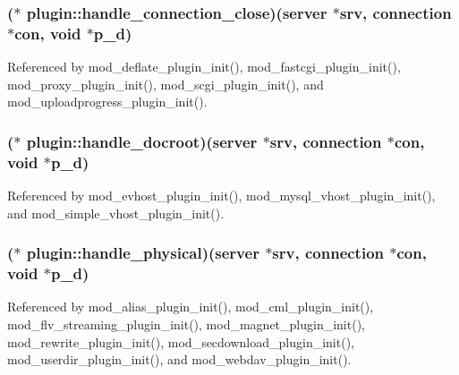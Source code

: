 \hypertarget{structplugin_ab59fbc651a4308ac4e89ed27d1d33a00}{
\subsubsection[{handle\-\_\-connection\-\_\-close}]{($\ast$  plugin\-::handle\-\_\-connection\-\_\-close)({\bf server} $\ast$srv, {\bf connection} $\ast$con, void $\ast$p\-\_\-d)}}\label{structplugin_ab59fbc651a4308ac4e89ed27d1d33a00}


Referenced by mod\-\_\-deflate\-\_\-plugin\-\_\-init(), mod\-\_\-fastcgi\-\_\-plugin\-\_\-init(), mod\-\_\-proxy\-\_\-plugin\-\_\-init(), mod\-\_\-scgi\-\_\-plugin\-\_\-init(), and mod\-\_\-uploadprogress\-\_\-plugin\-\_\-init().

\hypertarget{structplugin_ac6e9dddb37aca959bd90651e949d5f4d}{
\subsubsection[{handle\-\_\-docroot}]{($\ast$  plugin\-::handle\-\_\-docroot)({\bf server} $\ast$srv, {\bf connection} $\ast$con, void $\ast$p\-\_\-d)}}\label{structplugin_ac6e9dddb37aca959bd90651e949d5f4d}


Referenced by mod\-\_\-evhost\-\_\-plugin\-\_\-init(), mod\-\_\-mysql\-\_\-vhost\-\_\-plugin\-\_\-init(), and mod\-\_\-simple\-\_\-vhost\-\_\-plugin\-\_\-init().

\hypertarget{structplugin_ae5818db20f5d464df84a4c8bf4354567}{
\subsubsection[{handle\-\_\-physical}]{($\ast$  plugin\-::handle\-\_\-physical)({\bf server} $\ast$srv, {\bf connection} $\ast$con, void $\ast$p\-\_\-d)}}\label{structplugin_ae5818db20f5d464df84a4c8bf4354567}


Referenced by mod\-\_\-alias\-\_\-plugin\-\_\-init(), mod\-\_\-cml\-\_\-plugin\-\_\-init(), mod\-\_\-flv\-\_\-streaming\-\_\-plugin\-\_\-init(), mod\-\_\-magnet\-\_\-plugin\-\_\-init(), mod\-\_\-rewrite\-\_\-plugin\-\_\-init(), mod\-\_\-secdownload\-\_\-plugin\-\_\-init(), mod\-\_\-userdir\-\_\-plugin\-\_\-init(), and mod\-\_\-webdav\-\_\-plugin\-\_\-init().


